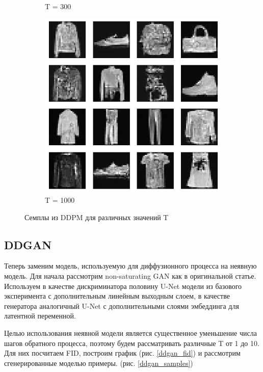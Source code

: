 \documentclass{article}
\begin{document}
\begin{figure}[H]
\begin{subfigure}[h]{0.3\linewidth}
		\caption{T = 300}
	\end{subfigure}
	\hfill
	\begin{subfigure}[h]{0.3\linewidth}
		\centering
		\includegraphics[scale=0.3]{../code/figures/generated_DDPM_1000.png}
		\caption{T = 1000}
	\end{subfigure}
\caption{Семплы из DDPM для различных значений T}\label{ddpm_samples}
\end{figure}

\subsection{DDGAN}
Теперь заменим модель, используемую для диффузионного процесса на неявную модель. Для начала рассмотрим non-saturating GAN \cite{https://doi.org/10.48550/arxiv.1406.2661} как в оригинальной статье. Используем в качестве дискриминатора половину U-Net модели из базового эксперимента с дополнительным линейным выходным слоем, в качестве генератора аналогичный U-Net с дополнительными слоями эмбеддинга для латентной переменной. 

Целью использования неявной модели является существенное уменьшение числа шагов обратного процесса, поэтому будем рассматривать различные T от 1 до 10. Для них посчитаем FID, построим график (рис. \ref{ddgan_fid}) и рассмотрим сгенерированные моделью примеры. (рис. \ref{ddgan_samples})
\end{document}
